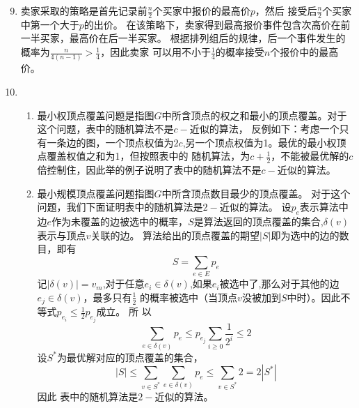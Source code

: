 \documentclass[a4paper]{article}
\begin{document}
\begin{enumerate}[label=\arabic*.]
  \setcounter{enumi}{8}    
    \item   卖家采取的策略是首先记录前$\frac{n}{2}$个买家中报价的最高价$p$，然后
    接受后$\frac{n}{2}$个买家中第一个大于$p$的出价。
    在该策略下，卖家得到最高报价事件包含次高价在前一半买家，最高价在后一半买家。
    根据排列组后的规律，后一个事件发生的概率为$\frac{n}{4(n-1)}>\frac{1}{4}$，因此卖家
    可以用不小于$\frac{1}{4}$的概率接受$n$个报价中的最高价。
  \setcounter{enumi}{17}    
      \item \begin{enumerate}[label=(\alph*)]

    \item 最小权顶点覆盖问题是指图$G$中所含顶点的权之和最小的顶点覆盖。对于这个问题，表中的随机算法不是$c-$近似的算法，
    反例如下：考虑一个只有一条边的图，一个顶点权值为$2c$,另一个顶点权值为1。最优的最小权顶点覆盖权值之和为1，但按照表中的
    随机算法，为$c+\frac{1}{2}$，不能被最优解的$c$倍控制住，因此举的例子说明了表中的随机算法不是$c-$近似的算法。
    \item 最小规模顶点覆盖问题指图$G$中所含顶点数目最少的顶点覆盖。
    对于这个问题，我们下面证明表中的随机算法是$2-$近似的算法。
    设$p_e$表示算法中边$e$作为未覆盖的边被选中的概率，$S$是算法返回的顶点覆盖的集合,$\delta(v)$表示与顶点$v$关联的边。
    算法给出的顶点覆盖的期望$|S|$即为选中的边的数目，即有
        \begin{equation}
           S=\sum_{e\in E} p_e
        \end{equation}
        记$|\delta(v)|=v_m$,对于任意$e_i\in \delta(v)$,如果$e_i$被选中了,那么对于其他的边$e_j \in \delta(v)$，最多只有$\frac{1}{2}$
        的概率被选中（当顶点$v$没被加到$S$中时）。因此不等式$p_{e_i}\leq \frac{1}{2} p_{e_j}$成立。
        所 以
    \begin{equation}
    \sum_{e\in \delta(v)} p_e\leq p_{e_j}\sum_{i\geq 0} \frac{1}{2^i}\leq 2
    \end{equation}
    设$S^*$为最优解对应的顶点覆盖的集合，
        \begin{equation}
           |S| \leq \sum_{v\in S^*} \sum_{e\in \delta(v)} p_e \leq \sum_{v\in S^*} 2 = 2|S^*|
        \end{equation}
    因此    表中的随机算法是$2-$近似的算法。
        \end{enumerate}
  \end{enumerate}
\end{document}
